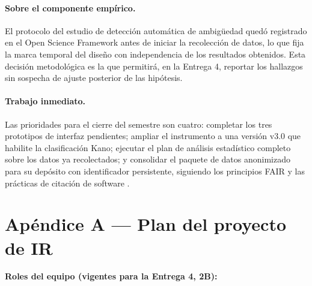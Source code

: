 \documentclass[journal,onecolumn]{IEEEtran}
\begin{document}
	\paragraph{Sobre el componente empírico.}
	El protocolo del estudio de detección automática de ambigüedad quedó
	registrado en el Open Science Framework antes de iniciar la recolección de
	datos, lo que fija la marca temporal del diseño con independencia de los
	resultados obtenidos. Esta decisión metodológica es la que permitirá, en la
	Entrega 4, reportar los hallazgos sin sospecha de ajuste posterior de las
	hipótesis.
	
	\paragraph{Trabajo inmediato.}
	Las prioridades para el cierre del semestre son cuatro: completar los tres
	prototipos de interfaz pendientes; ampliar el instrumento a una versión v3.0
	que habilite la clasificación Kano; ejecutar el plan de análisis estadístico
	completo sobre los datos ya recolectados; y consolidar el paquete de datos
	anonimizado para su depósito con identificador persistente, siguiendo los
	principios FAIR \cite{wilkinson2016} y las prácticas de citación de software
	\cite{smith2016}.
	
	\newpage
	\printbibliography[title={Referencias}]
	
	\newpage
	\appendix
	
	\section*{Apéndice A --- Plan del proyecto de IR}
	\label{ap:plan}
	
	\textbf{Roles del equipo (vigentes para la Entrega 4, 2B):}
	
\end{document}
